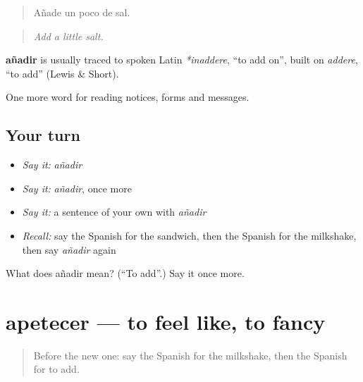 \begin{quote}
Añade un poco de sal.
\end{quote}

\begin{quote}
\emph{Add a little salt.}
\end{quote}

\begin{cousinweb}
\textbf{añadir} is usually traced to spoken Latin \emph{*inaddere}, \textquotedblleft{}to add on\textquotedblright{}, built on \emph{addere}, \textquotedblleft{}to add\textquotedblright{} (Lewis \& Short).
\end{cousinweb}

\begin{grammarlens}[title={What you've built}]
One more word for reading notices, forms and messages.
\end{grammarlens}

\subsection*{Your turn}
\begin{itemize}
\raggedright
  \item \emph{Say it:} \emph{añadir}
  \item \emph{Say it:} \emph{añadir}, once more
  \item \emph{Say it:} a sentence of your own with \emph{añadir}
  \item \emph{Recall:} say the Spanish for the sandwich, then the Spanish for the milkshake, then say \emph{añadir} again
\end{itemize}

\begin{tcolorbox}[breakable,colback=teal!4,colframe=teal!35!black,title={Before you move on}]
What does añadir mean? (\textquotedblleft{}To add\textquotedblright{}.) Say it once more.
\end{tcolorbox}
\section[apetecer]{apetecer — to feel like, to fancy}

\label{lesson:ES-C499-apetecer}



\begin{quote}
Before the new one: say the Spanish for the milkshake, then the Spanish for to add.
\end{quote}

